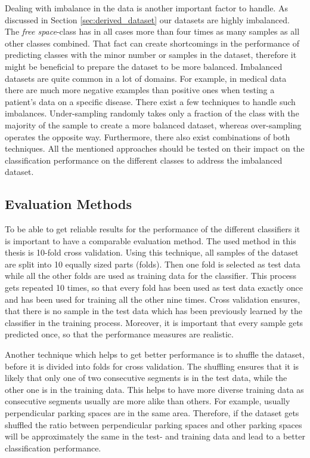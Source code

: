 Dealing with imbalance in the data is another important factor to handle. As discussed in Section \ref{sec:derived_dataset} our datasets are highly imbalanced. The \emph{free space}-class has in all cases more than four times as many samples as all other classes combined. That fact can create shortcomings in the performance of predicting classes with the minor number or samples in the dataset, therefore it might be beneficial to prepare the dataset to be more balanced. Imbalanced datasets are quite common in a lot of domains. For example, in medical data there are much more negative examples than positive ones when testing a patient's data on a specific disease. There exist a few techniques to handle such imbalances. Under-sampling randomly takes only a fraction of the class with the majority of the sample to create a more balanced dataset, whereas over-sampling operates the opposite way. Furthermore, there also exist combinations of both techniques. All the mentioned approaches should be tested on their impact on the classification performance on the different classes to address the imbalanced dataset.




\subsection{Evaluation Methods}
\label{sec:evaluation_methods}

To be able to get reliable results for the performance of the different classifiers it is important to have a comparable evaluation method. The used method in this thesis is 10-fold cross validation. Using this technique, all samples of the dataset are split into 10 equally sized parts (folds). Then one fold is selected as test data while all the other folds are used as training data for the classifier. This process gets repeated 10 times, so that every fold has been used as test data exactly once and has been used for training all the other nine times. Cross validation ensures, that there is no sample in the test data which has been previously learned by the classifier in the training process. Moreover, it is important that every sample gets predicted once, so that the performance measures are realistic.

Another technique which helps to get better performance is to shuffle the dataset, before it is divided into folds for cross validation. The shuffling ensures that it is likely that only one of two consecutive segments is in the test data, while the other one is in the training data. This helps to have more diverse training data as consecutive segments usually are more alike than others. For example, usually perpendicular parking spaces are in the same area. Therefore, if the dataset gets shuffled the ratio between perpendicular parking spaces and other parking spaces will be approximately the same in the test- and training data and lead to a better classification performance.



